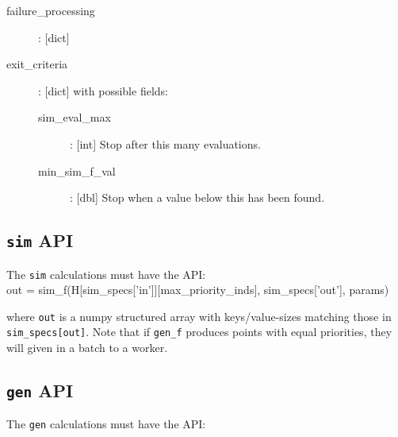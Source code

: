 \documentclass{article}
\newenvironment{allintypewriter}{\ttfamily}{\par}
\begin{document}
\begin{allintypewriter}
\begin{description}
    \item[failure\_processing]: [dict]

    \item[exit\_criteria]: [dict] with possible fields:
      \begin{description}
        \item[sim\_eval\_max]: [int] Stop after this many evaluations.
        \item[min\_sim\_f\_val]: [dbl] Stop when a value below this has been found.
      \end{description}


  \end{description}
\end{allintypewriter}
        


\subsection{\texttt{sim} API}
The \texttt{sim} calculations must have the API:\\

\begin{allintypewriter}
  out = sim\_f(H[sim\_specs['in']][max\_priority\_inds], sim\_specs['out'],
  params)\\
\end{allintypewriter}

where \texttt{out} is a numpy structured array with keys/value-sizes matching
those in \texttt{sim\_specs[out]}. Note that if \texttt{gen\_f} produces points
with equal priorities, they will given in a batch to a worker.

\subsection{\texttt{gen} API}
The \texttt{gen} calculations must have the API:\\
\end{document}

